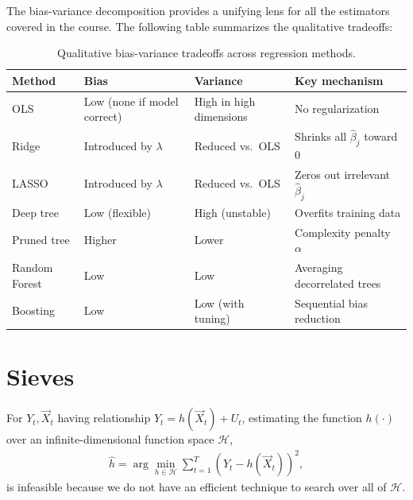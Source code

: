 \documentclass[11pt]{article}
\theoremstyle{definition}
\theoremstyle{plain}
\theoremstyle{remark}
\begin{document}
The bias-variance decomposition provides a unifying lens for all the estimators covered in the course. The following table summarizes the qualitative tradeoffs:

\begin{table}[H]
\centering
\renewcommand{\arraystretch}{1.3}
\begin{tabular}{@{}llll@{}}
\toprule
\textbf{Method} & \textbf{Bias} & \textbf{Variance} & \textbf{Key mechanism} \\
\midrule
OLS & Low (none if model correct) & High in high dimensions & No regularization \\
Ridge & Introduced by $\lambda$ & Reduced vs.\ OLS & Shrinks all $\hat{\beta}_j$ toward 0 \\
LASSO & Introduced by $\lambda$ & Reduced vs.\ OLS & Zeros out irrelevant $\hat{\beta}_j$ \\
Deep tree & Low (flexible) & High (unstable) & Overfits training data \\
Pruned tree & Higher & Lower & Complexity penalty $\alpha$ \\
Random Forest & Low & Low & Averaging decorrelated trees \\
Boosting & Low & Low (with tuning) & Sequential bias reduction \\
\bottomrule
\end{tabular}
\caption{Qualitative bias-variance tradeoffs across regression methods.}
\end{table}



\section{Sieves}

For $Y_t, \vec{X}_t$ having relationship $Y_t = h(\vec{X}_t) + U_t$, estimating the function $h(\cdot)$ over an infinite-dimensional function space $\mathcal{H}$,
\begin{align}
    \hat{h} = \arg \min_{h \in \mathcal{H}} \sum_{t=1}^T \left(Y_t - h(\vec{X}_t)\right)^2,
\end{align}
is infeasible because we do not have an efficient technique to search over all of $\mathcal{H}$.
\end{document}
